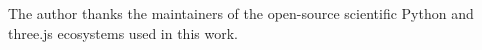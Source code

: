 \documentclass[aps,pra,reprint,amsmath,amssymb,superscriptaddress,nofootinbib]{revtex4-2}
\theoremstyle{plain}
\begin{document}
\maketitle











\begin{acknowledgments}
The author thanks the maintainers of the open-source scientific Python and three.js ecosystems used in this work.
\end{acknowledgments}

\appendix



\end{document}
